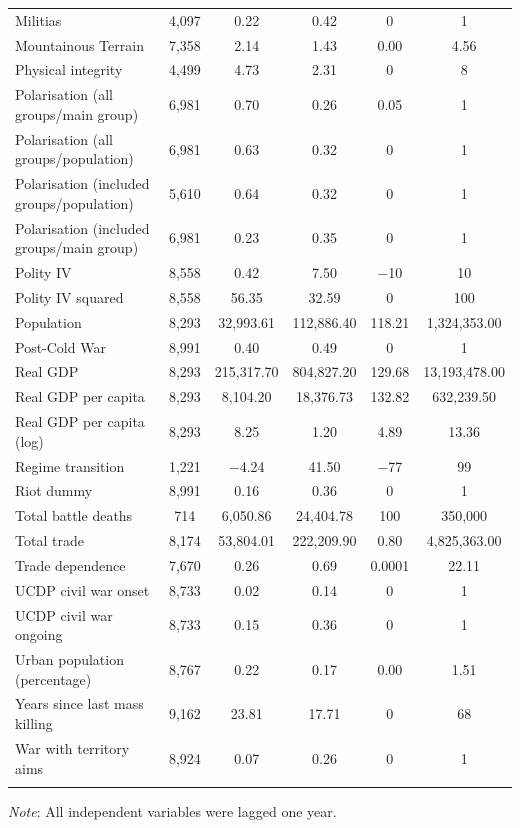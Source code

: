 \begin{table}[!htbp]
\begin{tabular}{@{\extracolsep{5pt}}lccccc}
Militias & 4,097 & 0.22 & 0.42 & 0 & 1 \\ 
Mountainous Terrain & 7,358 & 2.14 & 1.43 & 0.00 & 4.56 \\ 
Physical integrity & 4,499 & 4.73 & 2.31 & 0 & 8 \\ 
Polarisation (all groups/main group) & 6,981 & 0.70 & 0.26 & 0.05 & 1 \\ 
Polarisation (all groups/population) & 6,981 & 0.63 & 0.32 & 0 & 1 \\ 
Polarisation (included groups/population) & 5,610 & 0.64 & 0.32 & 0 & 1 \\ 
Polarisation (included groups/main group) & 6,981 & 0.23 & 0.35 & 0 & 1 \\ 
Polity IV & 8,558 & 0.42 & 7.50 & $-$10 & 10 \\ 
Polity IV squared & 8,558 & 56.35 & 32.59 & 0 & 100 \\ 
Population & 8,293 & 32,993.61 & 112,886.40 & 118.21 & 1,324,353.00 \\
Post-Cold War & 8,991 & 0.40 & 0.49 & 0 & 1 \\ 
Real GDP & 8,293 & 215,317.70 & 804,827.20 & 129.68 & 13,193,478.00 \\ 
Real GDP per capita & 8,293 & 8,104.20 & 18,376.73 & 132.82 & 632,239.50 \\ 
Real GDP per capita (log) & 8,293 & 8.25 & 1.20 & 4.89 & 13.36 \\ 
Regime transition & 1,221 & $-$4.24 & 41.50 & $-$77 & 99 \\ 
Riot dummy & 8,991 & 0.16 & 0.36 & 0 & 1 \\ 
Total battle deaths & 714 & 6,050.86 & 24,404.78 & 100 & 350,000 \\  
Total trade & 8,174 & 53,804.01 & 222,209.90 & 0.80 & 4,825,363.00 \\ 
Trade dependence & 7,670 & 0.26 & 0.69 & 0.0001 & 22.11 \\ 
UCDP civil war onset & 8,733 & 0.02 & 0.14 & 0 & 1 \\ 
UCDP civil war ongoing & 8,733 & 0.15 & 0.36 & 0 & 1 \\ 
Urban population (percentage) & 8,767 & 0.22 & 0.17 & 0.00 & 1.51 \\ 
Years since last mass killing & 9,162 & 23.81 & 17.71 & 0 & 68 \\ 
War with territory aims & 8,924 & 0.07 & 0.26 & 0 & 1 \\ 
\hline \\[-1.8ex] 
\end{tabular} 
\raggedright{\newline \textit{Note}: All independent variables were lagged one year.}
\end{table} 
\normalsize

